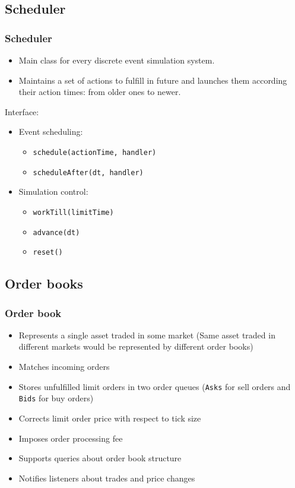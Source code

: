 \documentclass{beamer}
\begin{document}
\subsection{Scheduler} 
\begin{frame}
\frametitle{Scheduler}
\begin{itemize}
  \item Main class for every discrete event simulation system.
  \item Maintains a set of actions to fulfill in future and launches them according their action times: from older ones to newer.
\end{itemize}
Interface:
\begin{itemize}
  \item Event scheduling:
  \begin{itemize}
    \item \texttt{schedule(actionTime, handler)}
    \item \texttt{scheduleAfter(dt, handler)}
  \end{itemize}
  \item Simulation control:
  \begin{itemize}
    \item \texttt{workTill(limitTime)}
    \item \texttt{advance(dt)}
    \item \texttt{reset()}
  \end{itemize}
\end{itemize}
\end{frame}

\subsection{Order books} %
\begin{frame}
\frametitle{Order book}
\begin{itemize}
  \item Represents a single asset traded in some market (Same asset traded in different markets would be represented by different order books)
  \item Matches incoming orders
  \item Stores unfulfilled limit orders in two order queues (\texttt{Asks} for sell orders and \texttt{Bids} for buy orders)
  \item Corrects limit order price with respect to tick size
  \item Imposes order processing fee
  \item Supports queries about order book structure
  \item Notifies listeners about trades and price changes
\end{itemize}
\end{frame}
\end{document}
